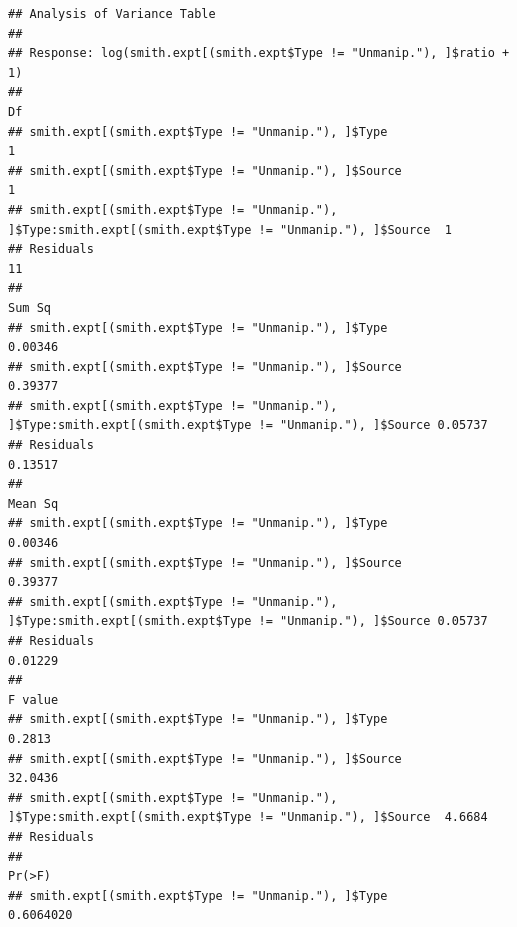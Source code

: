 \documentclass[]{article}
\begin{document}
\begin{verbatim}
## Analysis of Variance Table
## 
## Response: log(smith.expt[(smith.expt$Type != "Unmanip."), ]$ratio + 1)
##                                                                                                         Df
## smith.expt[(smith.expt$Type != "Unmanip."), ]$Type                                                       1
## smith.expt[(smith.expt$Type != "Unmanip."), ]$Source                                                     1
## smith.expt[(smith.expt$Type != "Unmanip."), ]$Type:smith.expt[(smith.expt$Type != "Unmanip."), ]$Source  1
## Residuals                                                                                               11
##                                                                                                          Sum Sq
## smith.expt[(smith.expt$Type != "Unmanip."), ]$Type                                                      0.00346
## smith.expt[(smith.expt$Type != "Unmanip."), ]$Source                                                    0.39377
## smith.expt[(smith.expt$Type != "Unmanip."), ]$Type:smith.expt[(smith.expt$Type != "Unmanip."), ]$Source 0.05737
## Residuals                                                                                               0.13517
##                                                                                                         Mean Sq
## smith.expt[(smith.expt$Type != "Unmanip."), ]$Type                                                      0.00346
## smith.expt[(smith.expt$Type != "Unmanip."), ]$Source                                                    0.39377
## smith.expt[(smith.expt$Type != "Unmanip."), ]$Type:smith.expt[(smith.expt$Type != "Unmanip."), ]$Source 0.05737
## Residuals                                                                                               0.01229
##                                                                                                         F value
## smith.expt[(smith.expt$Type != "Unmanip."), ]$Type                                                       0.2813
## smith.expt[(smith.expt$Type != "Unmanip."), ]$Source                                                    32.0436
## smith.expt[(smith.expt$Type != "Unmanip."), ]$Type:smith.expt[(smith.expt$Type != "Unmanip."), ]$Source  4.6684
## Residuals                                                                                                      
##                                                                                                            Pr(>F)
## smith.expt[(smith.expt$Type != "Unmanip."), ]$Type                                                      0.6064020

\end{verbatim}
\end{document}
